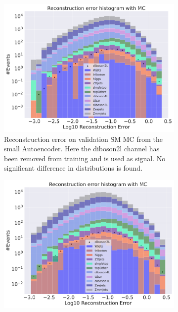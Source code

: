 \begin{figure}[H]
    \centering
    \begin{subfigure}{.45\textwidth}
        \includegraphics[width=\textwidth]{Figures/VAE_testing/small/b_data_recon_big_rm3_feats_sig_diboson2l.pdf}
        \caption{Reconstruction error on validation SM MC from the small Autoencoder. Here the diboson2l channel has been removed from training and 
        is used as signal. No significant difference in distributions is found.}
        \label{fig:vae_small_diboson2l}
    \end{subfigure}
    \hfill 
    \begin{subfigure}{.45\textwidth}
        \includegraphics[width=\textwidth]{Figures/VAE_testing/big/b_data_recon_big_rm3_feats_sig_diboson2l.pdf}

\end{subfigure}
\end{figure}
